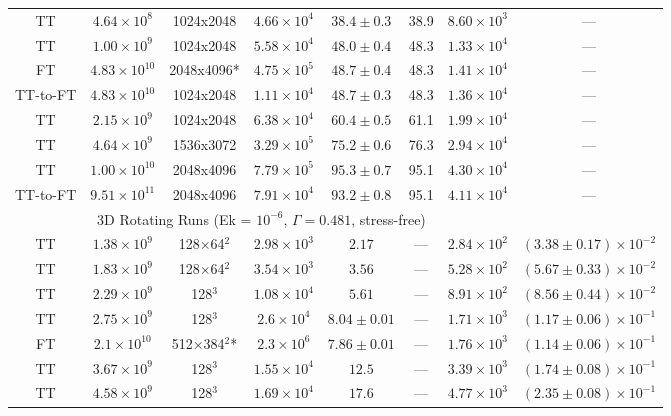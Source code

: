 \documentclass[aps, pre, onecolumn, nofootinbib, notitlepage, groupedaddress, amsfonts, amssymb, amsmath, longbibliography, superscriptaddress]{revtex4-1}
\begin{document}
\begin{table}[ht]
\begin{center}
\begin{tabularx}{\textwidth}{c c c c c c c c}
TT			&	$4.64 \times 10^8$		&	1024x2048	&	$4.66 \times 10^4$	&	$38.4 \pm 0.3$	&	38.9	&	$8.60 \times 10^3$ & --- \\
TT			&	$1.00 \times 10^9$		&	1024x2048	&	$5.58 \times 10^4$	&	$48.0 \pm 0.4$	&	48.3	&	$1.33 \times 10^4$ & --- \\
FT			&	$4.83 \times 10^{10}$	&	2048x4096*	&	$4.75 \times 10^5$	&	$48.7 \pm 0.4$	&	48.3	&	$1.41 \times 10^4$ & --- \\
TT-to-FT	&	$4.83 \times 10^{10}$	&	1024x2048	&	$1.11 \times 10^4$	&	$48.7 \pm 0.3$	&	48.3	&	$1.36 \times 10^4$ & --- \\
TT			&	$2.15 \times 10^9$		&	1024x2048	&	$6.38 \times 10^4$	&	$60.4 \pm 0.5$	&	61.1	&	$1.99 \times 10^4$ & --- \\
TT			&	$4.64 \times 10^9$		&	1536x3072	&	$3.29 \times 10^5$	&	$75.2 \pm 0.6$	&	76.3	&	$2.94 \times 10^4$ & --- \\
TT			&	$1.00 \times 10^{10}$	&	2048x4096	&	$7.79 \times 10^5$	&	$95.3 \pm 0.7$	&	95.1	&	$4.30 \times 10^4$ & --- \\
TT-to-FT	&	$9.51 \times 10^{11}$	&	2048x4096	&	$7.91 \times 10^4$	& 	$93.2 \pm 0.8$ 	&	95.1	&	$4.11 \times 10^4$ & --- \\
\hline																	
\multicolumn{7}{c}{\vspace{0.1cm}3D Rotating Runs (Ek = $10^{-6}$, $\Gamma = 0.481$, stress-free)} \\
\hline																	
TT	&	$1.38 \times 10^9$		&	128$\times$64$^2$	&	$2.98 \times 10^3$	&	$2.17$			&	---		&	$2.84 \times 10^2$  & $(3.38 \pm 0.17) \times 10^{-2}$ \\
TT	&	$1.83 \times 10^9$		&	128$\times$64$^2$	&	$3.54 \times 10^3$	&	$3.56$			&	---		&	$5.28 \times 10^2$  & $(5.67 \pm 0.33) \times 10^{-2}$ \\
TT	&	$2.29 \times 10^9$		&	128$^3$				&	$1.08 \times 10^4$	&	$5.61$			&	---		&	$8.91 \times 10^2$  & $(8.56 \pm 0.44) \times 10^{-2}$ \\
TT	&	$2.75 \times 10^9$		&	128$^3$				&	$2.6 \times 10^4$	&	$8.04 \pm 0.01$	&	---		&	$1.71 \times 10^3$  & $(1.17 \pm 0.06) \times 10^{-1}$ \\
FT	&	$2.1 \times 10^{10}$	&	512$\times$384$^2$*	&	$2.3 \times 10^6$	&	$7.86 \pm 0.01$	&	---		&	$1.76 \times 10^3$  & $(1.14 \pm 0.06) \times 10^{-1}$ \\
TT	&	$3.67 \times 10^9$		&	128$^3$				&	$1.55 \times 10^4$	&	$12.5$			&	---		&	$3.39 \times 10^3$  & $(1.74 \pm 0.08) \times 10^{-1}$ \\
TT	&	$4.58 \times 10^9$		&	128$^3$				&	$1.69 \times 10^4$	&	$17.6$			&	---		&	$4.77 \times 10^3$  & $(2.35 \pm 0.08) \times 10^{-1}$ \\

\end{tabularx}
\end{center}
\end{table}
\end{document}
